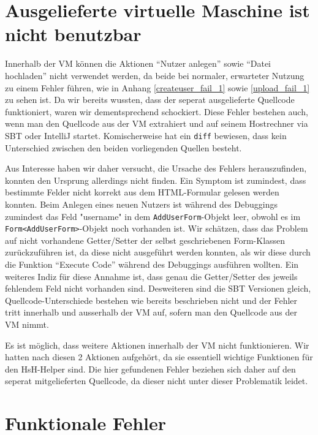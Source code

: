 \documentclass[12pt,DIV14,BCOR10mm,a4paper,parskip=half-,headsepline,headinclude,english,ngerman,bibliography=totocnumbered]{scrreprt}
\begin{document}
\vspace*{-3cm}

\tableofcontents  %

\chapter{Ausgelieferte virtuelle Maschine ist nicht benutzbar}

Innerhalb der VM können die Aktionen \enquote{Nutzer anlegen} sowie \enquote{Datei hochladen} nicht verwendet werden, da beide bei normaler, erwarteter Nutzung zu einem Fehler führen, wie in Anhang \ref{createuser_fail_1} sowie \ref{upload_fail_1} zu sehen ist.
Da wir bereits wussten, dass der seperat ausgelieferte Quellcode funktioniert, waren wir dementsprechend schockiert. 
Diese Fehler bestehen auch, wenn man den Quellcode aus der VM extrahiert und auf seinem Hostrechner via SBT oder IntelliJ startet.
Komischerweise hat ein \texttt{diff} bewiesen, dass kein Unterschied zwischen den beiden vorliegenden Quellen besteht.

Aus Interesse haben wir daher versucht, die Ursache des Fehlers herauszufinden, konnten den Ursprung allerdings nicht finden.
Ein Symptom ist zumindest, dass bestimmte Felder nicht korrekt aus dem HTML-Formular gelesen werden konnten.
Beim Anlegen eines neuen Nutzers ist während des Debuggings zumindest das Feld "username" in dem \texttt{AddUserForm}-Objekt leer, obwohl es im \texttt{Form<AddUserForm>}-Objekt noch vorhanden ist.
Wir schätzen, dass das Problem auf nicht vorhandene Getter/Setter der selbst geschriebenen Form-Klassen zurückzuführen ist, da diese nicht ausgeführt werden konnten, als wir diese durch die Funktion \enquote{Execute Code} während des Debuggings ausführen wollten.
Ein weiteres Indiz für diese Annahme ist, dass genau die Getter/Setter des jeweils fehlendem Feld nicht vorhanden sind.
Desweiteren sind die SBT Versionen gleich, Quellcode-Unterschiede bestehen wie bereits beschrieben nicht und der Fehler tritt innerhalb und ausserhalb der VM auf, sofern man den Quellcode aus der VM nimmt.

Es ist möglich, dass weitere Aktionen innerhalb der VM nicht funktionieren. Wir hatten nach diesen 2 Aktionen aufgehört, da sie essentiell wichtige Funktionen für den HsH-Helper sind.
Die hier gefundenen Fehler beziehen sich daher auf den seperat mitgelieferten Quellcode, da dieser nicht unter dieser Problematik leidet.

\chapter{Funktionale Fehler}
\end{document}
